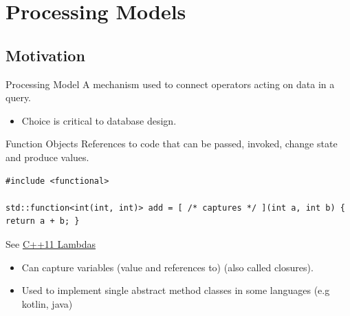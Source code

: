 \chapter{Processing Models}

\section{Motivation}
\begin{definitionbox}{Processing Model}
    A mechanism used to connect operators acting on data in a query.
    \begin{itemize}
        \item Choice is critical to database design.
    \end{itemize}
\end{definitionbox}

\begin{definitionbox}{Function Objects}
    References to code that can be passed, invoked, change state and produce values.
    \begin{verbatim}
#include <functional>

std::function<int(int, int)> add = [ /* captures */ ](int a, int b) { return a + b; }
    \end{verbatim}
    See \href{https://en.cppreference.com/w/cpp/language/lambda}{C++11 Lambdas}
    \begin{itemize}
        \item Can capture variables (value and references to) (also called closures).
        \item Used to implement single abstract method classes in some languages (e.g kotlin, java)
    \end{itemize}
\end{definitionbox}

